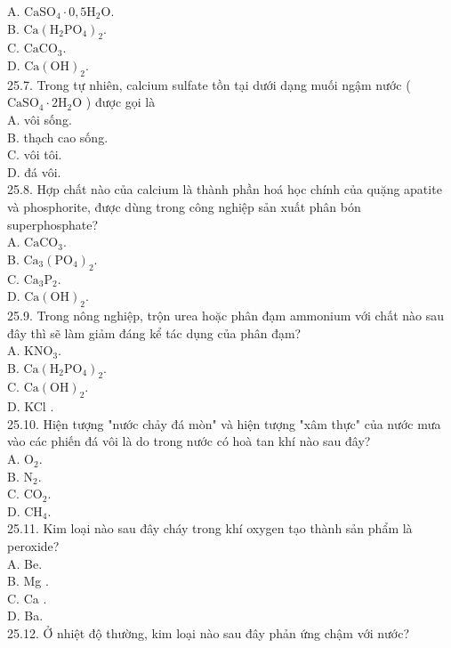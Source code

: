 \documentclass[10pt]{article}
\begin{document}
A. $\mathrm{CaSO}_{4} \cdot 0,5 \mathrm{H}_{2} \mathrm{O}$.\\
B. $\mathrm{Ca}\left(\mathrm{H}_{2} \mathrm{PO}_{4}\right)_{2}$.\\
C. $\mathrm{CaCO}_{3}$.\\
D. $\mathrm{Ca}(\mathrm{OH})_{2}$.\\
25.7. Trong tự nhiên, calcium sulfate tồn tại dưới dạng muối ngậm nước ( $\mathrm{CaSO}_{4} \cdot 2 \mathrm{H}_{2} \mathrm{O}$ ) được gọi là\\
A. vôi sống.\\
B. thạch cao sống.\\
C. vôi tôi.\\
D. đá vôi.\\
25.8. Hợp chất nào của calcium là thành phần hoá học chính của quặng apatite và phosphorite, được dùng trong công nghiệp sản xuất phân bón superphosphate?\\
A. $\mathrm{CaCO}_{3}$.\\
B. $\mathrm{Ca}_{3}\left(\mathrm{PO}_{4}\right)_{2}$.\\
C. $\mathrm{Ca}_{3} \mathrm{P}_{2}$.\\
D. $\mathrm{Ca}(\mathrm{OH})_{2}$.\\
25.9. Trong nông nghiệp, trộn urea hoặc phân đạm ammonium với chất nào sau đây thì sẽ làm giảm đáng kể tác dụng của phân đạm?\\
A. $\mathrm{KNO}_{3}$.\\
B. $\mathrm{Ca}\left(\mathrm{H}_{2} \mathrm{PO}_{4}\right)_{2}$.\\
C. $\mathrm{Ca}(\mathrm{OH})_{2}$.\\
D. KCl .\\
25.10. Hiện tượng "nước chảy đá mòn" và hiện tượng "xâm thực" của nước mưa vào các phiến đá vôi là do trong nước có hoà tan khí nào sau đây?\\
A. $\mathrm{O}_{2}$.\\
B. $\mathrm{N}_{2}$.\\
C. $\mathrm{CO}_{2}$.\\
D. $\mathrm{CH}_{4}$.\\
25.11. Kim loại nào sau đây cháy trong khí oxygen tạo thành sản phẩm là peroxide?\\
A. Be.\\
B. Mg .\\
C. Ca .\\
D. Ba.\\
25.12. Ở nhiệt độ thường, kim loại nào sau đây phản ứng chậm với nước?\\
\end{document}
